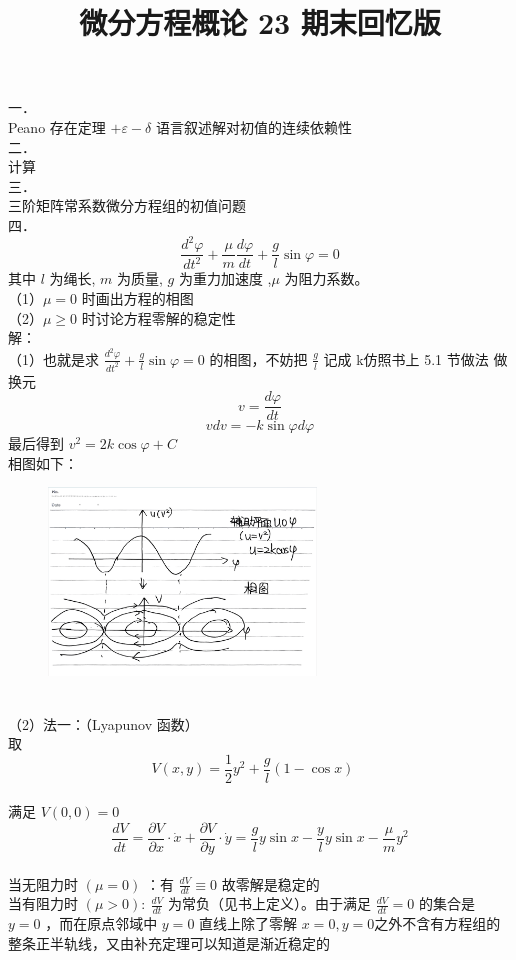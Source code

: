 \documentclass[UTF8]{ctexart}
\title{微分方程概论 23 期末回忆版}
\author{\textcalligra{NULIOUS}}
\date{}
\begin{document}
\maketitle
\noindent 一．\\
Peano 存在定理 $+\varepsilon-\delta$ 语言叙述解对初值的连续依赖性\\
二．\\
计算\\
三．\\
三阶矩阵常系数微分方程组的初值问题\\
四．\\
$$
\frac{d^{2} \varphi}{d t^{2}}+\frac{\mu}{m} \frac{d \varphi}{d t}+\frac{g}{l} \sin \varphi=0
$$
其中 $l$ 为绳长, $m$ 为质量, $g$ 为重力加速度 ,$\mu$ 为阻力系数。\\
（1）$\mu=0$ 时画出方程的相图\\
（2）$\mu \geq 0$ 时讨论方程零解的稳定性\\
解：\\
（1）也就是求 $\frac{d^{2} \varphi}{d t^{2}}+\frac{g}{l} \sin \varphi=0$ 的相图，不妨把 $\frac{g}{l}$ 记成 k仿照书上 5.1 节做法
做换元 $$v=\frac{d \varphi}{d t}$$
\[v d v=-k \sin \varphi d \varphi\]
最后得到 $v^{2}=2 k \cos \varphi+C$\\
相图如下：\\
\begin{figure}[h]  
\centering  
\includegraphics[height=5cm]{23期末.png} 
\label{fig:my_label}  
\end{figure}\\
（2）法一：（Lyapunov 函数）\\
取 $$V(x, y)=\frac{1}{2} y^{2}+\frac{g}{l}(1-\cos x) \quad$$\\ 满足 $V(0,0)=0$\\
$$\frac{d V}{d t}=\frac{\partial V}{\partial x} \cdot \dot{x}+\frac{\partial V}{\partial y} \cdot \dot{y}=\frac{g}{l} y \sin x-\frac{y}{l} y \sin x-\frac{\mu}{m} y^{2}$$\\
当无阻力时 $(\mu=0)$ ：有 $\frac{d V}{d t} \equiv 0$ 故零解是稳定的\\
当有阻力时 $(\mu>0): ~ \frac{d V}{d t}$ 为常负（见书上定义）。由于满足 $\frac{d V}{d t}=0$ 的集合是 $y=0$ ，而在原点邻域中 $y=0$ 直线上除了零解 $x=0, y=0$之外不含有方程组的整条正半轨线，又由补充定理可以知道是渐近稳定的
\end{document}
